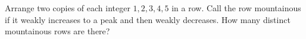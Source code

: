 Arrange two copies of each integer $1,2,3,4,5$ in a row. Call the row mountainous if it weakly increases to a peak and then weakly decreases. How many distinct mountainous rows are there?
